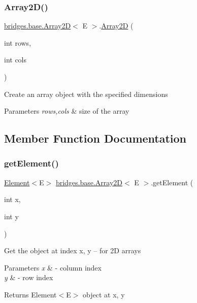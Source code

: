 \subsubsection{\texorpdfstring{Array2\+D()}{Array2D()}\hspace{0.1cm}{\footnotesize\ttfamily [2/2]}}
{\footnotesize\ttfamily \hyperlink{classbridges_1_1base_1_1_array2_d}{bridges.\+base.\+Array2D}$<$ E $>$.\hyperlink{classbridges_1_1base_1_1_array2_d}{Array2D} (\begin{DoxyParamCaption}\item[{int}]{rows,  }\item[{int}]{cols }\end{DoxyParamCaption})}

Create an array object with the specified dimensions


\begin{DoxyParams}{Parameters}
{\em rows,cols} & size of the array \\
\hline
\end{DoxyParams}


\subsection{Member Function Documentation}
\mbox{\label{classbridges_1_1base_1_1_array2_d_a65797bf0a9c176ad18fba85cdf6470bd}} 
\subsubsection{\texorpdfstring{get\+Element()}{getElement()}}
{\footnotesize\ttfamily \hyperlink{classbridges_1_1base_1_1_element}{Element}$<$E$>$ \hyperlink{classbridges_1_1base_1_1_array2_d}{bridges.\+base.\+Array2D}$<$ E $>$.get\+Element (\begin{DoxyParamCaption}\item[{int}]{x,  }\item[{int}]{y }\end{DoxyParamCaption})}

Get the object at index x, y -- for 2D arrays


\begin{DoxyParams}{Parameters}
{\em x} & -\/ column index \\
\hline
{\em y} & -\/ row index \\
\hline
\end{DoxyParams}
\begin{DoxyReturn}{Returns}
Element$<$\+E$>$ object at x, y 
\end{DoxyReturn}
\mbox{\label{classbridges_1_1base_1_1_array2_d_a093f0b451def8c5229fe1bed22658fb1}} 
